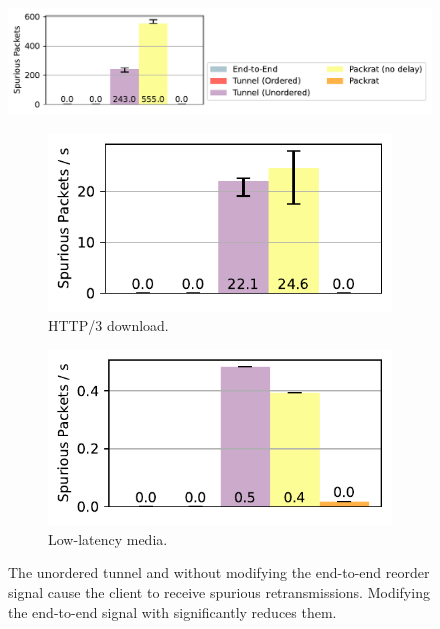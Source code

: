 \begin{figure}[ht]
\centering
\begin{minipage}[t]{0.3\textwidth}
    \includegraphics[width=\linewidth, trim=245 15 5 65, clip]{figures/spurious_retx_legend.pdf}
    \begin{subfigure}[b]{\linewidth}
        \includegraphics[width=\linewidth]{figures/spurious_retx_http.pdf}
        \caption{HTTP/3 download.}
        \label{fig:http:spurious}
    \end{subfigure}
    \begin{subfigure}[b]{\linewidth}
        \includegraphics[width=\linewidth]{figures/spurious_retx_media.pdf}
        \caption{Low-latency media.}
        \label{fig:media:spurious}
    \end{subfigure}
    \caption{The unordered tunnel and \Sys without modifying the end-to-end reorder signal cause the client to receive spurious retransmissions. Modifying the end-to-end signal with \Sys significantly reduces them.}

\end{minipage}
\end{figure}
